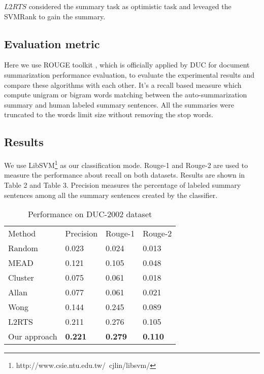 \documentclass{acm_proc_article-sp}
\begin{document}
$L2RTS$ considered the summary task as optimistic task and  leveaged the SVMRank to gain the summary.

\subsection{Evaluation metric}

Here we use ROUGE toolkit \cite{2004-Lin-p74-81} , which is officially applied by DUC for document summarization performance evaluation, to evaluate the experimental results and compare these algorithms with each other. 
It's a recall based measure which compute unigram or bigram words matching between the auto-summarization summary and human labeled summary sentences.
All the summaries were truncated to the words limit size without removing the stop words.

\subsection{Results}

We use LibSVM\footnote{http://www.csie.ntu.edu.tw/~cjlin/libsvm/} as our classification mode.
Rouge-1 and Rouge-2 are used to measure the performance about recall on both datasets. Results are shown in Table 2 and Table 3.
Precision measures the percentage of labeled summary sentences among all the summary sentences created by the classifier.

\begin{table}
\caption{Performance on DUC-2002 dataset}
\centering
\begin{tabular}{llll}
\hline\noalign{\smallskip}
Method   &  Precision    & Rouge-1  				& Rouge-2 \\
\noalign{\smallskip}
\hline
\noalign{\smallskip}
Random & 0.023 			& 		0.024 			&  0.013 \\
MEAD    &	0.121			& 		0.105	 			&	0.048					 				\\
Cluster	&	0.075			&		0.061				&	0.018					 				\\
Allan		&	0.077			&		0.061				&	0.021						 			\\
Wong		&	0.144			&		0.245				&	0.089									\\
L2RTS	&	0.211			&		0.276				&	0.105						 			\\
Our approach	&	\textbf{0.221}	&		\textbf{0.279}				&	\textbf{0.110}								      \\
\hline
\end{tabular}
\end{table}
\end{document}
